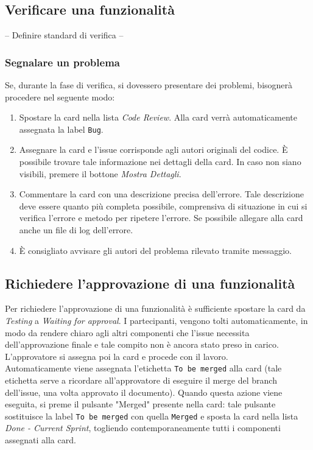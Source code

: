 \subsection{Verificare una funzionalità}
-- Definire standard di verifica --\\

\subsubsection{Segnalare un problema}
Se, durante la fase di verifica, si dovessero presentare dei problemi, bisognerà procedere nel seguente modo:
\begin{enumerate}
    \item Spostare la card nella lista \textit{Code Review}. Alla card verrà automaticamente assegnata la label \texttt{Bug}.
    \item Assegnare la card e l'issue corrisponde agli autori originali del codice. È possibile trovare tale informazione nei dettagli della card. In caso non siano visibili, premere il bottone \textit{Mostra Dettagli}.
    \item Commentare la card con una descrizione precisa dell'errore. Tale descrizione deve essere quanto più completa possibile, comprensiva di situazione in cui si verifica l'errore e metodo per ripetere l'errore. Se possibile allegare alla card anche un file di log dell'errore.
    \item È consigliato avvisare gli autori del problema rilevato tramite messaggio.
\end{enumerate}

\subsection{Richiedere l'approvazione di una funzionalità}
Per richiedere l'approvazione di una funzionalità è sufficiente spostare la card da \textit{Testing} a \textit{Waiting for approval}. I partecipanti, vengono tolti automaticamente, in modo da rendere chiaro agli altri componenti che l'issue necessita dell'approvazione finale e tale compito non è ancora stato preso in carico. L'approvatore si assegna poi la card e procede con il lavoro.
\\Automaticamente viene assegnata l'etichetta \texttt{To be merged} alla card (tale etichetta serve a ricordare all'approvatore di eseguire il merge del branch dell'issue, una volta approvato il documento).
Quando questa azione viene eseguita, si preme il pulsante "Merged" presente nella card: tale pulsante sostituisce la label \texttt{To be merged} con quella \texttt{Merged} e sposta la card nella lista \textit{Done - Current Sprint}, togliendo contemporaneamente tutti i componenti assegnati alla card.
